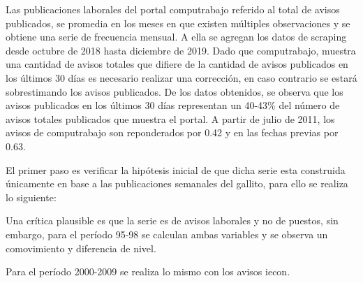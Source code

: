 Las publicaciones laborales del portal computrabajo referido al total de avisos publicados, se promedia en los meses en que existen múltiples observaciones y se obtiene una serie de frecuencia mensual. A ella se agregan los datos de scraping desde octubre de 2018 hasta diciembre de 2019. Dado que computrabajo, muestra una cantidad de avisos totales que difiere de la cantidad de avisos publicados en los últimos 30 días es necesario realizar una corrección, en caso contrario se estará sobrestimando los avisos publicados. De los datos obtenidos, se observa que los avisos publicados en los últimos 30 días representan un 40-43\% del número de avisos totales publicados que muestra el portal. A partir de julio de 2011, los avisos de computrabajo son reponderados por 0.42 y en las fechas previas por 0.63. 	 




El primer paso es verificar la hipótesis inicial de que dicha serie esta construida únicamente en base a las publicaciones semanales del gallito, para ello se realiza lo siguiente:

Una crítica plausible es que la serie es de avisos laborales y no de puestos, sin embargo, para el período 95-98 se calculan ambas variables y se observa un comovimiento y diferencia de nivel.

Para el período 2000-2009 se realiza lo mismo con los avisos iecon.










